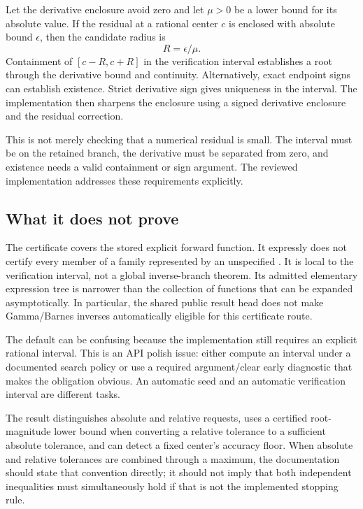 \documentclass[11pt,a4paper]{article}
\newcommand{\code}[1]{\texttt{\detokenize{#1}}}
\theoremstyle{definition}
\begin{document}
Let the derivative enclosure avoid zero and let $\mu>0$ be a lower bound for its absolute value. If the residual at a rational center $c$ is enclosed with absolute bound $\epsilon$, then the candidate radius is
\[
 R=\epsilon/\mu.
\]
Containment of $[c-R,c+R]$ in the verification interval establishes a root through the derivative bound and continuity. Alternatively, exact endpoint signs can establish existence. Strict derivative sign gives uniqueness in the interval. The implementation then sharpens the enclosure using a signed derivative enclosure and the residual correction.\cite{certificates,transport}

This is not merely checking that a numerical residual is small. The interval must be on the retained branch, the derivative must be separated from zero, and existence needs a valid containment or sign argument. The reviewed implementation addresses these requirements explicitly.

\subsection{What it does not prove}

The certificate covers the stored explicit forward function. It expressly does not certify every member of a family represented by an unspecified \code{"InputRemainder"}. It is local to the verification interval, not a global inverse-branch theorem. Its admitted elementary expression tree is narrower than the collection of functions that can be expanded asymptotically. In particular, the shared public result head does not make Gamma/Barnes inverses automatically eligible for this certificate route.\cite{certificates}

The default \code{"Interval" -> Automatic} can be confusing because the implementation still requires an explicit rational interval. This is an API polish issue: either compute an interval under a documented search policy or use a required argument/clear early diagnostic that makes the obligation obvious. An automatic seed and an automatic verification interval are different tasks.

The result distinguishes absolute and relative requests, uses a certified root-magnitude lower bound when converting a relative tolerance to a sufficient absolute tolerance, and can detect a fixed center's accuracy floor. When absolute and relative tolerances are combined through a maximum, the documentation should state that convention directly; it should not imply that both independent inequalities must simultaneously hold if that is not the implemented stopping rule.\cite{certificates}
\end{document}
